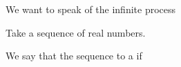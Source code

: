 
\sbasic





\sstart



We want to speak of the infinite
process


Take a sequence of real numbers.

We say that the sequence
to a
if

\strats
